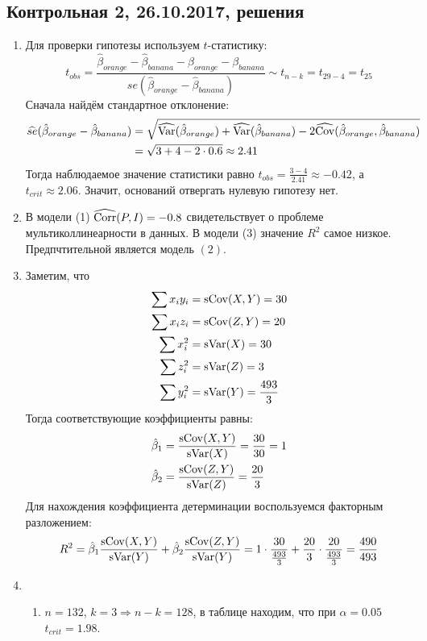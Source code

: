 \subsection{Контрольная 2, 26.10.2017, решения}

\begin{enumerate}
\item Для проверки гипотезы используем $t$-статистику:
\[
t_{obs} = \frac{\hat\beta_{orange} - \hat\beta_{banana} - \beta_{orange} - \beta_{banana}}{se(\hat\beta_{orange} - \hat\beta_{banana})} \sim t_{n-k} = t_{29 -4} = t_{25}
\]
Сначала найдём стандартное отклонение:
\begin{align*}
\widehat{se}(\hat\beta_{orange} - \hat\beta_{banana}) &= \sqrt{\widehat{\operatorname{Var}}(\hat\beta_{orange}) + \widehat{\operatorname{Var}}(\hat\beta_{banana}) - 2 \widehat{\operatorname{Cov}}(\hat\beta_{orange}, \hat\beta_{banana})} \\
&= \sqrt{3 + 4 - 2\cdot 0.6} \approx 2.41
\end{align*}
Тогда наблюдаемое значение статистики равно $t_{obs} = \frac{3-4}{2.41} \approx -0.42$,
а $t_{crit} \approx 2.06$. Значит, оснований отвергать нулевую гипотезу нет.
\item В модели (1) $\widehat{\operatorname{Corr}}(P,I)=-0.8$ свидетельствует о проблеме мультиколлинеарности в данных.
В модели (3) значение $R^2$ самое низкое. Предпчтительной является модель $(2)$.
\item Заметим, что
\begin{align*}
\sum x_i y_i &= \operatorname{sCov}(X,Y) = 30 \\
\sum x_i z_i &= \operatorname{sCov}(Z,Y) = 20 \\
\sum x_i^2 &= \operatorname{sVar}(X) = 30 \\
\sum z_i^2 &= \operatorname{sVar}(Z) = 3 \\
\sum y_i^2 &= \operatorname{sVar}(Y) = \frac{493}{3} \\
\end{align*}
Тогда соответствующие коэффициенты равны:
\begin{align*}
\hat \beta_1 &= \frac{\operatorname{sCov}(X,Y)}{\operatorname{sVar}(X)} = \frac{30}{30} = 1 \\
\hat \beta_2 &= \frac{\operatorname{sCov}(Z,Y)}{\operatorname{sVar}(Z)} = \frac{20}{3}
\end{align*}
Для нахождения коэффициента детерминации воспользуемся факторным разложением:
\[
R^2 = \hat\beta_1 \frac{\operatorname{sCov}(X,Y)}{\operatorname{sVar}(Y)} + \hat\beta_2 \frac{\operatorname{sCov}(Z,Y)}{\operatorname{sVar}(Y)} = 1 \cdot \frac{30}{\frac{493}{3}} + \frac{20}{3} \cdot \frac{20}{\frac{493}{3}} = \frac{490}{493}
\]
\item
\begin{enumerate}
\item $n=132$, $k=3 \Rightarrow n-k = 128$, в таблице находим,
что при $\alpha = 0.05$ $t_{crit} = 1.98$.


\end{enumerate}
\end{enumerate}
